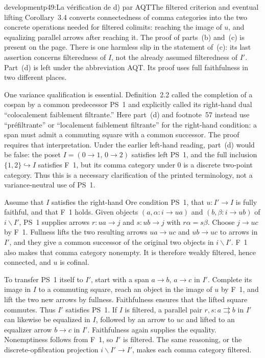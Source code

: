 \begin{dcomment}{development}{p49:La vérification de d) par AQT}{The filtered criterion and eventual lifting}
Corollary~3.4 converts connectedness of comma categories into the two concrete operations needed for filtered colimits: reaching the image of $u$, and equalizing parallel arrows after reaching it. The proof of parts~(b) and~(c) is present on the page. There is one harmless slip in the statement of~(c): its last assertion concerns filteredness of $I$, not the already assumed filteredness of $I'$. Part~(d) is left under the abbreviation AQT. Its proof uses full faithfulness in two different places.

One variance qualification is essential. Definition~2.2 called the completion of a cospan by a common predecessor PS~1 and explicitly called its right-hand dual ``colocalement faiblement filtrante.'' Here part~(d) and footnote~57 instead use ``pr\'efiltrante'' or ``localement faiblement filtrante'' for the right-hand condition: a span must admit a commuting square with a common successor. The proof requires that interpretation. Under the earlier left-hand reading, part~(d) would be false: the poset $I=(0\longrightarrow1,\,0\longrightarrow2)$ satisfies left PS~1, and the full inclusion $\{1,2\}\hookrightarrow I$ satisfies F~1, but its comma category under $0$ is a discrete two-point category. Thus this is a necessary clarification of the printed terminology, not a variance-neutral use of PS~1.

Assume that $I$ satisfies the right-hand Ore condition PS~1, that $u:I'\longrightarrow I$ is fully faithful, and that F~1 holds. Given objects $(a,\alpha:i\longrightarrow u a)$ and $(b,\beta:i\longrightarrow u b)$ of $i\backslash I'$, PS~1 supplies arrows $r:u a\longrightarrow j$ and $s:u b\longrightarrow j$ with $r\alpha=s\beta$. Choose $j\longrightarrow u c$ by F~1. Fullness lifts the two resulting arrows $u a\longrightarrow u c$ and $u b\longrightarrow u c$ to arrows in $I'$, and they give a common successor of the original two objects in $i\backslash I'$. F~1 also makes that comma category nonempty. It is therefore weakly filtered, hence connected, and $u$ is cofinal.

To transfer PS~1 itself to $I'$, start with a span $a\longrightarrow b$, $a\longrightarrow c$ in $I'$. Complete its image in $I$ to a commuting square, reach an object in the image of $u$ by F~1, and lift the two new arrows by fullness. Faithfulness ensures that the lifted square commutes. Thus $I'$ satisfies PS~1. If $I$ is filtered, a parallel pair $r,s:a\rightrightarrows b$ in $I'$ can likewise be equalized in $I$, followed by an arrow to $u c$ and lifted to an equalizer arrow $b\longrightarrow c$ in $I'$. Faithfulness again supplies the equality. Nonemptiness follows from F~1, so $I'$ is filtered. The same reasoning, or the discrete-opfibration projection $i\backslash I'\longrightarrow I'$, makes each comma category filtered.


\end{dcomment}
